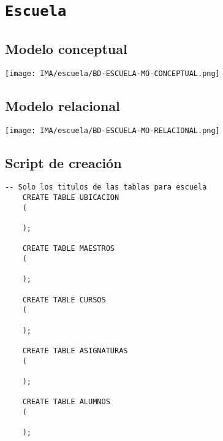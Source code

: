 \section{\texttt{Escuela}}
  
\subsection{Modelo conceptual}
\begin{center}
    \texttt{[image: IMA/escuela/BD-ESCUELA-MO-CONCEPTUAL.png]}
\end{center}


\subsection{Modelo relacional}
\begin{center}
  \texttt{[image: IMA/escuela/BD-ESCUELA-MO-RELACIONAL.png]}
\end{center}


\subsection{Script de creación}
\begin{lstlisting}[caption={Tablas para la BdDatos}, label={lst:sql_estadios}]
    -- Solo los titulos de las tablas para escuela    
    CREATE TABLE UBICACION
    (
      
    );
    
    CREATE TABLE MAESTROS
    (
      
    );
    
    CREATE TABLE CURSOS
    (
      
    );
    
    CREATE TABLE ASIGNATURAS
    (
      
    );
    
    CREATE TABLE ALUMNOS
    (

    );    
\end{lstlisting}

